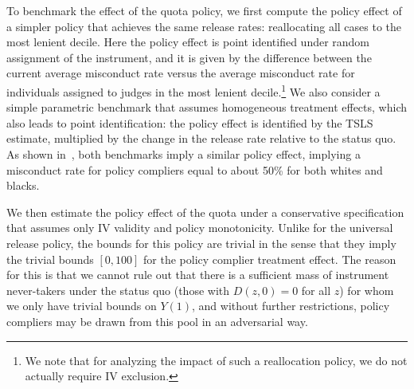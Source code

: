 \documentclass[12pt]{article}%
\theoremstyle{definition}
\newcommand\1{\operatorname{I}\indicatorfence}
\begin{document}
To benchmark the effect of the quota policy, we first compute the policy effect
of a simpler policy that achieves the same release rates: reallocating all cases
to the most lenient decile. Here the policy effect is point identified under
random assignment of the instrument, and it is given by the difference between
the current average misconduct rate versus the average misconduct rate for
individuals assigned to judges in the most lenient decile.\footnote{We note that
  for analyzing the impact of such a reallocation policy, we do not actually
  require IV exclusion.} We also consider a simple parametric benchmark that
assumes homogeneous treatment effects, which also leads to point identification:
the policy effect is identified by the TSLS estimate, multiplied by the change
in the release rate relative to the status quo. As shown
in~, both benchmarks imply a similar policy effect, implying
a misconduct rate for policy compliers equal to about 50\% for both whites and blacks.
%

We then estimate the policy effect of the quota under a conservative specification that
assumes only \ac{IV} validity and policy monotonicity. Unlike for the universal
release policy, the bounds for this policy are trivial in the sense that they
imply the trivial bounds $[0, 100]$ for the policy complier treatment effect.
The reason for this is that we cannot rule out that there is a sufficient mass
of instrument never-takers under the status quo (those with $D(z,0)=0$ for all
$z$) for whom we only have trivial bounds on $Y(1)$, and without further
restrictions, policy compliers may be drawn from this pool in an adversarial
way.
\end{document}
